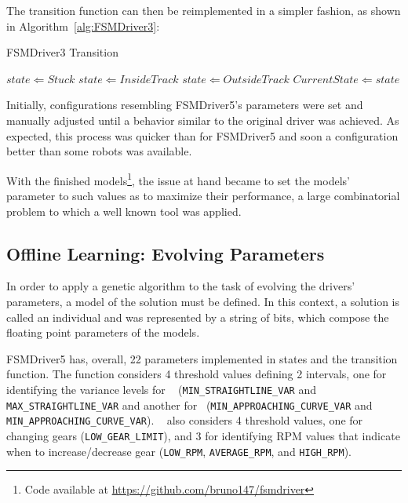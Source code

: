 The transition function can then be reimplemented in a simpler fashion, as shown in Algorithm~\ref{alg:FSMDriver3}:

\begin{algorithm}[h]%
\caption{FSMDriver3 Transition}%
\label{alg:FSMDriver3}%
\begin{algorithmic}
        \STATE $state \Leftarrow Stuck$
    \ELSE
            \STATE $state \Leftarrow Inside Track$
        \ELSE
            \STATE $state \Leftarrow Outside Track$
        \ENDIF
    \ENDIF
        \STATE $Current State \Leftarrow state$
    \ENDIF
\end{algorithmic}
\end{algorithm}

Initially, configurations resembling FSMDriver5's parameters were set and manually adjusted until a behavior similar to the original driver was achieved. As expected, this process was quicker than for FSMDriver5 and soon a configuration better than some robots was available.

With the finished models\footnote{Code available at \url{https://github.com/bruno147/fsmdriver}}, the issue at hand became to set the models' parameter to such values as to maximize their performance, a large combinatorial problem to which a well known tool was applied.

\subsection{Offline Learning: Evolving Parameters}%
In order to apply a genetic algorithm to the task of evolving the drivers' parameters, a model of the solution must be defined. In this context, a solution is called an individual and was represented by a string of bits, which compose the floating point parameters of the models.

FSMDriver5 has, overall, 22 parameters implemented in states and the transition function. The function considers 4 threshold values defining 2 intervals, one for identifying the variance levels for \SL~ (\texttt{MIN\_STRAIGHTLINE\_VAR} and \texttt{MAX\_STRAIGHTLINE\_VAR} and another for \AC~(\texttt{MIN\_APPROACHING\_CURVE\_VAR} and \texttt{MIN\_APPROACHING\_CURVE\_VAR}). \SL~ also considers 4 threshold values, one for changing gears (\texttt{LOW\_GEAR\_LIMIT}), and 3 for identifying RPM values that indicate when to increase/decrease gear (\texttt{LOW\_RPM}, \texttt{AVERAGE\_RPM}, and \texttt{HIGH\_RPM}).

